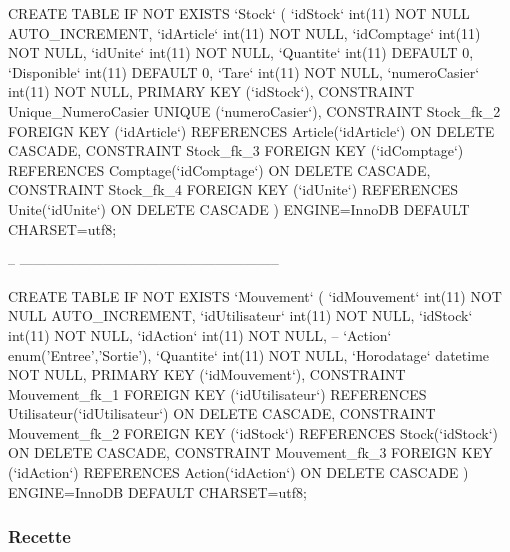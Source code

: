 \begin{DoxyCode}
CREATE TABLE IF NOT EXISTS `Stock` (
  `idStock` int(11) NOT NULL AUTO\_INCREMENT,
  `idArticle` int(11) NOT NULL,
  `idComptage` int(11) NOT NULL,
  `idUnite` int(11) NOT NULL,
  `Quantite` int(11) DEFAULT 0,
  `Disponible` int(11) DEFAULT 0,
  `Tare` int(11) NOT NULL,  
  `numeroCasier` int(11) NOT NULL,
  PRIMARY KEY (`idStock`),
  CONSTRAINT Unique\_NumeroCasier UNIQUE (`numeroCasier`),
  CONSTRAINT Stock\_fk\_2 FOREIGN KEY (`idArticle`) REFERENCES Article(`idArticle`) ON DELETE CASCADE,
  CONSTRAINT Stock\_fk\_3 FOREIGN KEY (`idComptage`) REFERENCES Comptage(`idComptage`) ON DELETE CASCADE,
  CONSTRAINT Stock\_fk\_4 FOREIGN KEY (`idUnite`) REFERENCES Unite(`idUnite`) ON DELETE CASCADE
) ENGINE=InnoDB DEFAULT CHARSET=utf8;

-- --------------------------------------------------------

CREATE TABLE IF NOT EXISTS `Mouvement` (
  `idMouvement` int(11) NOT NULL AUTO\_INCREMENT, 
  `idUtilisateur` int(11) NOT NULL,
  `idStock` int(11) NOT NULL,
  `idAction` int(11) NOT NULL,
  --   `Action` enum('Entree','Sortie'),
  `Quantite` int(11) NOT NULL,
  `Horodatage` datetime NOT NULL,
  PRIMARY KEY (`idMouvement`),
  CONSTRAINT Mouvement\_fk\_1 FOREIGN KEY (`idUtilisateur`) REFERENCES Utilisateur(`idUtilisateur`) ON DELETE
       CASCADE,
  CONSTRAINT Mouvement\_fk\_2 FOREIGN KEY (`idStock`) REFERENCES Stock(`idStock`) ON DELETE CASCADE,
  CONSTRAINT Mouvement\_fk\_3 FOREIGN KEY (`idAction`) REFERENCES Action(`idAction`) ON DELETE CASCADE
) ENGINE=InnoDB DEFAULT CHARSET=utf8;
\end{DoxyCode}
\hypertarget{page__r_e_a_d_m_e_recette}{}\subsubsection{Recette}\label{page__r_e_a_d_m_e_recette}

